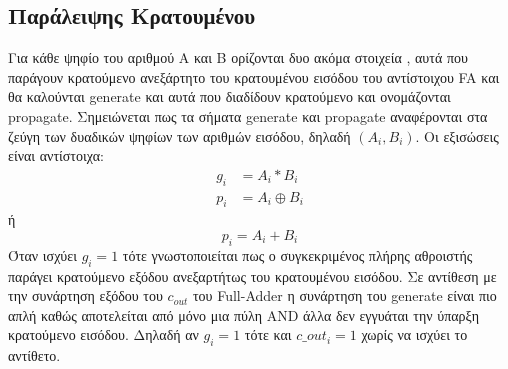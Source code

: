 \subsection{Παράλειψης Κρατουμένου}
Για κάθε ψηφίο του αριθμού Α και Β ορίζονται δυο ακόμα στοιχεία , αυτά που παράγουν κρατούμενο ανεξάρτητο του κρατουμένου εισόδου του αντίστοιχου FA και θα καλούνται generate και αυτά που διαδίδουν κρατούμενο και ονομάζονται propagate. Σημειώνεται πως τα σήματα generate και propagate αναφέρονται στα ζεύγη των δυαδικών ψηφίων των αριθμών εισόδου, δηλαδή $(A_i,B_i)$. Οι εξισώσεις είναι αντίστοιχα:
\begin{equation}
\begin{split}
    g_i &= A_i * B_i  \\
    p_i &= A_i \oplus B_i 
\end{split}
\end{equation}
ή
\begin{equation*}
    p_i = A_i + B_i
\end{equation*}
Όταν ισχύει $g_i=1$ τότε γνωστοποιείται πως ο συγκεκριμένος πλήρης αθροιστής παράγει κρατούμενο εξόδου ανεξαρτήτως του κρατουμένου εισόδου. Σε αντίθεση με την συνάρτηση εξόδου του $c_{out}$ του Full-Adder η συνάρτηση του generate είναι πιο απλή καθώς αποτελείται από μόνο μια πύλη AND άλλα δεν εγγυάται την ύπαρξη κρατούμενο εισόδου. Δηλαδή αν $g_i=1$ τότε και $c\_out_i=1$ χωρίς να ισχύει το αντίθετο. 


